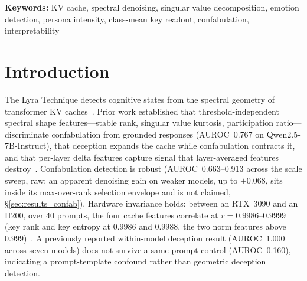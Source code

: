 \documentclass[11pt,a4paper]{article}
\begin{document}
\begin{abstract}
We had hypothesized a spectral hierarchy---dominant singular values carrying
scale and processing mode, residual values carrying discriminative
structure---under which denoising would amplify weak signals. The
selection-bias result means this remains a hypothesis, not a demonstrated
tool: the raw features carry the reported signal, and whether denoising adds
to it awaits a confirmatory test.

We apply a canonical pipeline---one FWL correction, one cross-validation
scheme, one classifier, with SVD denoising as an evaluated (not assumed)
step---to 17~models (not all on every phenomenon) across confabulation,
self-reference, individuation,
persona intensity, emotion, and cognitive modes. The robust core: raw
spectral shape reads cognitive mode (confabulation 0.66--0.91, ethical
deliberation 0.87--0.89). A class-mean key readout separates a ten-emotion
binary split at 0.992, but that split is confounded with arousal and the
margin over text is only $0.029$; on 30 emotions the readout does not beat
text. The Lyra Technique is a toolkit---a thermometer, with the proposed
compass withdrawn for emotion and the proposed denoising amplifier flagged
as unconfirmed.

\end{abstract}

\noindent\textbf{Keywords:} KV cache, spectral denoising, singular value decomposition, emotion detection, persona intensity, class-mean key readout, confabulation, interpretability

\section{Introduction}
\label{sec:intro}

The Lyra Technique detects cognitive states from the spectral geometry of
transformer KV caches~\citep{lyra_p2,lyra_spectral,lyra_delta}. Prior work
established that threshold-independent spectral shape features---stable rank,
singular value kurtosis, participation ratio---discriminate confabulation from
grounded responses (AUROC~0.767 on Qwen2.5-7B-Instruct), that deception
expands the cache while confabulation contracts it, and that per-layer delta
features capture signal that layer-averaged features
destroy~\citep{lyra_delta}. Confabulation detection is robust
(AUROC~0.663--0.913 across the scale sweep, raw; an apparent denoising
gain on weaker models, up to $+0.068$, sits inside its max-over-rank
selection envelope and is not claimed, \S\ref{sec:results_confab}). Hardware invariance holds:
between an RTX~3090 and an H200, over 40 prompts, the four cache features
correlate at $r = 0.9986$--$0.9999$ (key rank and key entropy at $0.9986$
and $0.9988$, the two norm features above $0.999$)~\citep{lyra_p2}. A previously reported within-model deception
result (AUROC~1.000 across seven models) does not survive a same-prompt
control (AUROC~0.160), indicating a prompt-template confound rather than
geometric deception detection.
\end{document}
